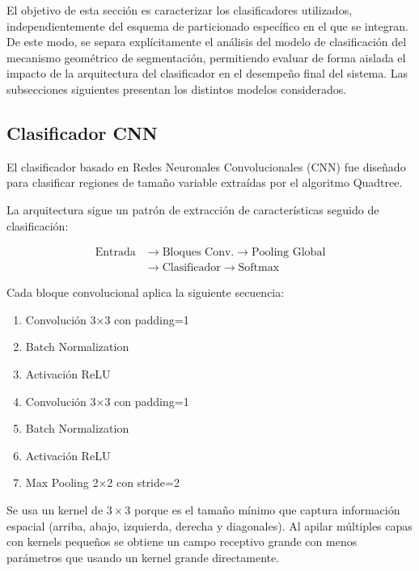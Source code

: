 \documentclass[onecolumn, 12pt , journal]{IEEEtran}
\begin{document}
El objetivo de esta sección es caracterizar los clasificadores utilizados, independientemente del esquema de particionado específico en el que se integran. De este modo, se separa explícitamente el análisis del modelo de clasificación del mecanismo geométrico de segmentación, permitiendo evaluar de forma aislada el impacto de la arquitectura del clasificador en el desempeño final del sistema. Las subsecciones siguientes presentan los distintos modelos considerados.

\subsection{Clasificador CNN}

El clasificador basado en Redes Neuronales Convolucionales (CNN) fue diseñado 
para clasificar regiones de tamaño variable extraídas por el algoritmo Quadtree.


La arquitectura sigue un patrón de extracción de características seguido de 
clasificación:

\begin{equation}
    \begin{aligned}
        \text{Entrada} &\rightarrow \text{Bloques Conv.} \rightarrow 
        \text{Pooling Global} \\
        &\rightarrow \text{Clasificador} \rightarrow \text{Softmax}
    \end{aligned}
\end{equation}


Cada bloque convolucional aplica la siguiente secuencia:

\begin{enumerate}
    \item Convolución 3×3 con padding=1
    \item Batch Normalization
    \item Activación ReLU
    \item Convolución 3×3 con padding=1
    \item Batch Normalization
    \item Activación ReLU
    \item Max Pooling 2×2 con stride=2
\end{enumerate}

Se usa un kernel de $3 \times 3$ porque es el tamaño mínimo que captura información 
espacial (arriba, abajo, izquierda, derecha y diagonales). Al apilar múltiples 
capas con kernels pequeños se obtiene un campo receptivo grande con menos 
parámetros que usando un kernel grande directamente.
\end{document}
